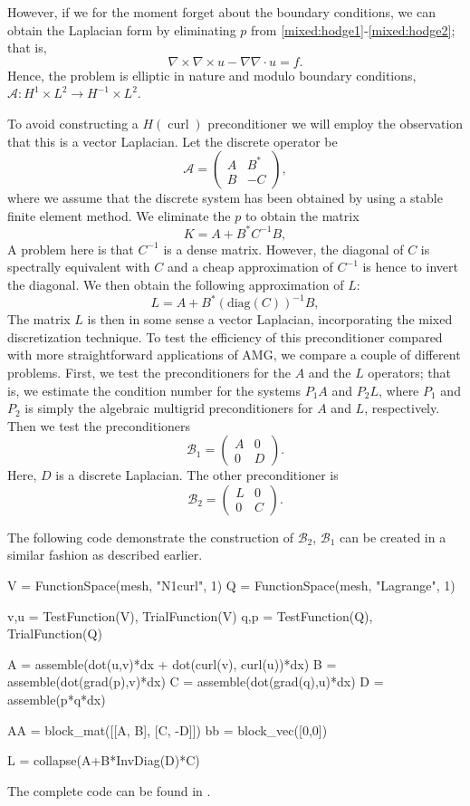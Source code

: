 However, if we for the moment forget about the boundary conditions,
we can obtain the Laplacian form  by eliminating $p$
from \eqref{mixed:hodge1}-\eqref{mixed:hodge2}; that is,
\[
\nabla \times \nabla \times u - \nabla \nabla \cdot u = f .
\]
Hence, the problem is elliptic
in nature and modulo boundary conditions,  $\mathcal{A}: H^1 \times L^2 \rightarrow  H^{-1} \times L^2$.

To avoid constructing a $H(\operatorname{curl})$ preconditioner we will employ
the observation that this is a vector Laplacian.
Let the discrete operator be
\[
\mathcal{A}  =
\begin{pmatrix} A & B^* \\ B & -C \end{pmatrix},
\]
where we assume that the discrete system has been obtained by using a stable finite
element method. We eliminate the $p$ to obtain the matrix
\[
K  = A +  B^* C^{-1} B,
\]
A problem here is that $C^{-1}$ is a dense matrix. However, the diagonal of $C$ is spectrally equivalent with $C$ and a cheap approximation of $C^{-1}$ is hence
to invert the diagonal. We then obtain the following approximation of $L$:
\[
L  = A +  B^* (\mathrm{diag}(C))^{-1} B,
\]
The matrix $L$ is then in some sense a vector Laplacian,
incorporating the mixed discretization technique.  To test the
efficiency of this preconditioner compared with more straightforward
applications of AMG, we compare a couple of different problems.
First, we test the preconditioners for the $A$ and the $L$
operators; that is, we estimate the condition number for the systems
$P_1 A$ and $P_2 L$, where $P_1$ and $P_2$ is simply the algebraic
multigrid preconditioners for $A$ and $L$, respectively.  Then we
test the preconditioners
\[
\mathcal{B}_1  =
\begin{pmatrix} A & 0  \\ 0  & D \end{pmatrix}.
\]
Here, $D$ is a discrete Laplacian. The other preconditioner is
\[
\mathcal{B}_2  =
\begin{pmatrix} L & 0  \\ 0  & C \end{pmatrix}.
\]

The following code demonstrate the construction of $\mathcal{B}_2$,
$\mathcal{B}_1$ can be created in a similar fashion as described earlier.
\begin{python}
V = FunctionSpace(mesh, "N1curl", 1)
Q = FunctionSpace(mesh, "Lagrange", 1)

v,u = TestFunction(V), TrialFunction(V)
q,p = TestFunction(Q), TrialFunction(Q)

A = assemble(dot(u,v)*dx + dot(curl(v), curl(u))*dx)
B = assemble(dot(grad(p),v)*dx)
C = assemble(dot(grad(q),u)*dx)
D = assemble(p*q*dx)

AA = block_mat([[A,  B],
                [C, -D]])
bb = block_vec([0,0])

L = collapse(A+B*InvDiag(D)*C)
\end{python}
The complete code can be found in .

